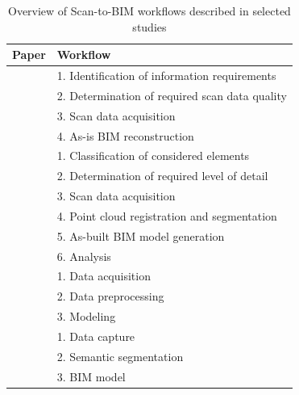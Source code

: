 \begin{table}[h]
    \centering
    \begin{tabular}{p{1cm} p{9cm}}
        \textbf{Paper} & \textbf{Workflow} \\
        \hline
        \cite{wangApplicationOrientedScantoBIM2019} & 1. Identification of information requirements \\
                & 2. Determination of required scan data quality \\
                & 3. Scan data acquisition \\
                & 4. As-is BIM reconstruction \\
        \hline
        \cite{badenkoSCANTOBIMMETHODOLOGYADAPTED2019} & 1. Classification of considered elements \\
                & 2. Determination of required level of detail \\
                & 3. Scan data acquisition \\
                & 4. Point cloud registration and segmentation \\
                & 5. As-built BIM model generation \\
                & 6. Analysis \\
        \hline
        \cite{borrusoProceduralPointCloud2023} & 1. Data acquisition \\
                & 2. Data preprocessing \\
                & 3. Modeling \\
        \hline
        \cite{rashdiScanningTechnologiesBuilding2022} & 1. Data capture \\
                & 2. Semantic segmentation \\
                & 3. BIM model \\
    \end{tabular}
    \caption{Overview of Scan-to-BIM workflows described in selected studies}
    \label{tab:scan-to-bim_workflows}
\end{table}



